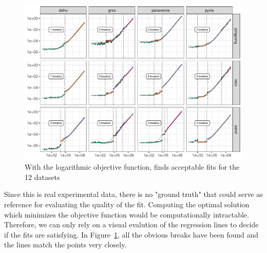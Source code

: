                \begin{figure}[htpb]
                    \centering
                    \includegraphics[width=\linewidth]{img/prediction/modeling/network/pycewise_demo.pdf}
                    \caption{With the logarithmic objective function, \pyce finds acceptable fits for the 12 datasets}%
                    \label{fig:prediction:pycewise_demo}
                \end{figure}

                Since this is real experimental data, there is no "ground truth" that could serve as reference for
                evaluating the quality of the fit. Computing the optimal solution which minimizes the objective function
                would be computationally intractable. Therefore, we can only rely on a visual evalution of the
                regression lines to decide if the fits are satisfying. In Figure~\ref{fig:prediction:pycewise_demo}, all
                the obvious breaks have been found and the lines match the points very closely.

